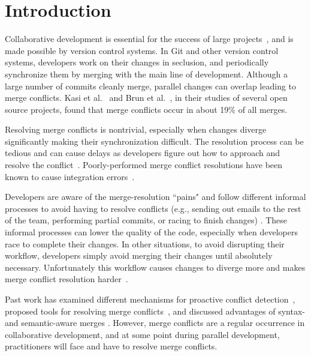

\section{Introduction}\label{introduction}

Collaborative development is essential for the success of large projects~\cite{hattori2010syde}, and is made possible by version control systems. 
In Git and other version control systems, developers work on their changes in seclusion, and periodically synchronize them by merging with the main line of development. 
Although a large number of commits cleanly merge, parallel changes can overlap leading to merge conflicts. Kasi et al.~\cite{cassandra} and Brun et al.~\cite{Brun2011}, in their studies of several open source projects, found that merge conflicts occur in about 19\% of all merges.

Resolving merge conflicts is nontrivial, especially when changes diverge significantly making their synchronization difficult. 
The resolution process can be tedious and can cause delays as developers figure out how to approach and resolve the conflict~\cite{cassandra}. 
Poorly-performed merge conflict resolutions have been known to cause integration errors~\cite{bird-branches-conflict}. 

Developers are aware of the merge-resolution ``pains" and follow different informal processes to avoid having to resolve conflicts (e.g., sending out emails to the rest of the team, performing partial commits, or racing to finish changes) \cite{deSouza2003breaking}\cite{cataldo2008distributed_dev}.
These informal processes can lower the quality of the code, especially when developers race to complete their changes. 
In other situations, to avoid disrupting their workflow, developers simply avoid merging their changes until absolutely necessary.
Unfortunately this workflow causes changes to diverge more and makes merge conflict resolution harder~\cite{Brun2011}. 


Past work has examined different mechanisms for proactive conflict detection~\cite{Brun2011}\cite{palantir}\cite{Guimaraes}, proposed tools for resolving merge conflicts~\cite{nishimura}\cite{mens2002state}, and discussed advantages of syntax- and semantic-aware merges \cite{danny_refactorings}\cite{hunt2002extensible}. 
However, merge conflicts are a regular occurrence in collaborative development, and at some point during parallel development, practitioners will face and have to resolve merge conflicts.

